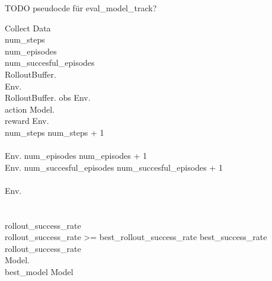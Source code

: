 TODO pseudocde für eval\_model\_track?

\renewcommand{\thepseudonum}{\roman{pseudonum}}
\begin{pseudocode}{Collect Data}{ }
    \\

    num\_steps \\
    num\_episodes \\
    num\_succesful\_episodes \\

    RolloutBuffer.\\
    Env.\\
    \WHILE RolloutBuffer. \DO
    \BEGIN
    obs \GETS Env.\\
    action \GETS Model.\\
    reward \GETS Env.\\
    num\_steps \GETS num\_steps + 1\\
    \\
    \IF Env. \THEN
    \BEGIN
    num\_episodes \GETS num\_episodes + 1\\
    \IF Env. \THEN
    \BEGIN
    num\_succesful\_episodes \GETS num\_succesful\_episodes + 1\\
    \END\\
    Env.\\
    \END\\
    \END\\

    rollout\_success\_rate \GETS {}\\

    \IF rollout\_success\_rate >= best\_rollout\_success\_rate \THEN
    \BEGIN
    best\_success\_rate \GETS rollout\_success\_rate\\
    Model.\\
    best\_model \GETS Model\\
    \END\\


    \ENDPROCEDURE
    \label{pseudocode:collect_data}
\end{pseudocode}

